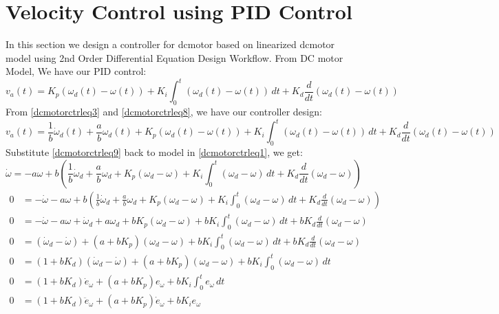 \section{Velocity Control using PID Control}
In this section we design a controller for dcmotor based on linearized dcmotor model using 2nd Order Differential Equation Design Workflow. From DC motor Model, We have our PID control:
\begin{equation}
	\label{dcmotorctrleq8}
	v_a(t) = K_p(\omega_d(t) - \omega(t)) + K_i \int_{0}^{t} (\omega_d(t) - \omega(t)) \,dt + K_d \frac{d}{dt} (\omega_d(t) - \omega(t))
\end{equation}
From \autoref{dcmotorctrleq3} and \autoref{dcmotorctrleq8}, we have our controller design:
\begin{equation}
	\label{dcmotorctrleq9}
	v_a(t) = \frac{1}{b}\dot{\omega}_d(t) + \frac{a}{b}\omega_d(t) + K_p(\omega_d(t) - \omega(t)) + K_i \int_{0}^{t} (\omega_d(t) - \omega(t)) \,dt + K_d \frac{d}{dt} (\omega_d(t) - \omega(t))
\end{equation}
Substitute \autoref{dcmotorctrleq9} back to model in \autoref{dcmotorctrleq1}, we get:
\begin{equation}
	\label{dcmotorctrleq10}
	\dot{\omega} = -a\omega + b\left(\frac{1}{b}\dot{\omega}_d + \frac{a}{b}\omega_d + K_p(\omega_d - \omega) + K_i \int_{0}^{t} (\omega_d - \omega) \,dt + K_d \frac{d}{dt} (\omega_d - \omega) \right)
\end{equation}
\[
\begin{split}
	0 &= -\dot{\omega} -a\omega + b(\frac{1}{b}\dot{\omega}_d + \frac{a}{b}\omega_d + K_p(\omega_d - \omega) + K_i \int_{0}^{t} (\omega_d - \omega) \,dt + K_d \frac{d}{dt} (\omega_d - \omega)) \\
	0 &= -\dot{\omega} -a\omega + \dot{\omega}_d + a\omega_d + bK_p(\omega_d - \omega) + bK_i \int_{0}^{t} (\omega_d - \omega) \,dt + bK_d \frac{d}{dt} (\omega_d - \omega) \\
	0 &= (\dot{\omega}_d -\dot{\omega}) + (a+bK_p)(\omega_d -\omega) + bK_i \int_{0}^{t} (\omega_d - \omega) \,dt + bK_d \frac{d}{dt} (\omega_d - \omega) \\
	0 &= (1+bK_d)(\dot{\omega}_d -\dot{\omega}) + (a+bK_p)(\omega_d -\omega) + bK_i \int_{0}^{t} (\omega_d - \omega) \,dt \\
	0 &= (1+bK_d)\dot{e}_{\omega} + (a+bK_p)e_{\omega} + bK_i \int_{0}^{t} e_{\omega} \,dt \\
	0 &= (1+bK_d)\ddot{e}_{\omega} + (a+bK_p)\dot{e}_{\omega} + bK_i e_{\omega} \\
\end{split}
\]
